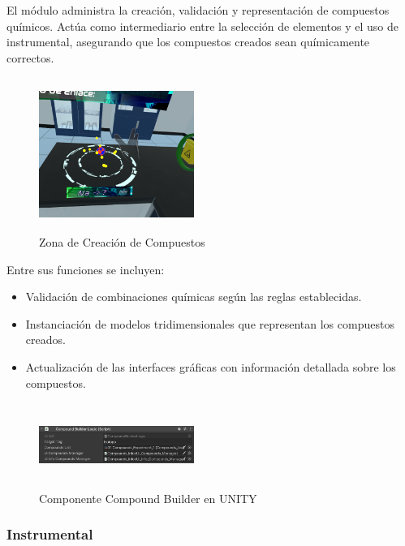 \documentclass[conference]{IEEEtran}
\begin{document}
El módulo administra la creación, validación y representación de compuestos químicos. Actúa como intermediario entre la selección de elementos y el uso de instrumental, asegurando que los compuestos creados sean químicamente correctos\cite{Fernando2021}. 
\begin{figure}[thbp]
    \centering
    \includegraphics[width=0.45\textwidth, height = 5cm]{img/Zona_Creación (2).png}
    \caption{Zona de Creación de Compuestos}
    \label{fig:Zona de Creación de Compuestos}
\end{figure}

Entre sus funciones se incluyen:
\begin{itemize}
    \item Validación de combinaciones químicas según las reglas establecidas.
    \item Instanciación de modelos tridimensionales que representan los compuestos creados.
    \item Actualización de las interfaces gráficas con información detallada sobre los compuestos.
\end{itemize}
\begin{figure}[thbp]
    \centering
    \includegraphics[width=0.45\textwidth, height = 2.75cm]{img/Compound_Builder.png}
    \caption{Componente Compound Builder en UNITY}
    \label{fig:Componente Compound Builder en UNITYs}
\end{figure}

\subsubsection{Instrumental}
\end{document}
